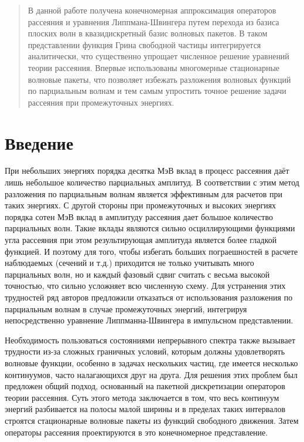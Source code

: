 \documentclass[a4paper,12pt]{article}
\begin{document}
	\setcounter{page}{2}
	\tableofcontents
    \pagebreak
     
	\begin{abstract}
		В данной работе получена конечномерная аппроксимация операторов рассеяния и уравнения Липпмана-Швингера путем перехода из базиса плоских волн в квазидискретный базис волновых пакетов. В таком представлении функция Грина свободной частицы интегрируется аналитически, что существенно упрощает численное решение уравнений теории рассеяния. Впервые использованы многомерные стационарные волновые пакеты, что позволяет избежать разложения волновых функций по парциальным волнам и тем самым упростить точное решение задачи рассеяния при промежуточных энергиях.
	\end{abstract}
	\pagebreak

	\section{Введение}
При небольших энергиях порядка десятка МэВ вклад в процесс рассеяния даёт лишь небольшое количество парциальных амплитуд. В соответствии с этим метод разложения по парциальным волнам является эффективным для расчетов при таких энергиях. С другой стороны при промежуточных и высоких энергиях порядка сотен МэВ вклад в амплитуду рассеяния дает большое количество парциальных волн. Такие вклады являются сильно осциллирующими функциями угла рассеяния при этом результирующая амплитуда является более гладкой функцией. И поэтому для того, чтобы избегать больших пограешностей в расчете наблюдаемых (сечений и т.д.) приходится не только учитывать много парциальных волн, но и каждый фазовый сдвиг считать с весьма высокой точностью, что сильно усложняет всю численную схему. Для устранения этих трудностей ряд авторов предложили отказаться от использования разложения по парциальным волнам в случае промежуточных энергий, интегрируя непосредственно уравнение Липпманна-Швингера в импульсном представлении\cite{elster}.

Необходимость пользоваться состояниями непрерывного спектра также вызывает трудности из-за сложных граничных условий, которым должны удовлетворять волновые функции, особенно в задачах нескольких частиц, где имеется несколько континуумов, часто налагающихся друг на друга. Для решения этих проблем был предложен общий подход\cite{kuku2}\cite{kuku1}, основанный на пакетной  дискретизации операторов теории рассеяния. Суть этого метода заключается в том, что весь континуум энергий разбивается на полосы малой ширины и в пределах таких интервалов строятся стационарные волновые пакеты из функций свободного движения. Затем операторы рассеяния проектируются в это конечномерное представление.
\end{document}
